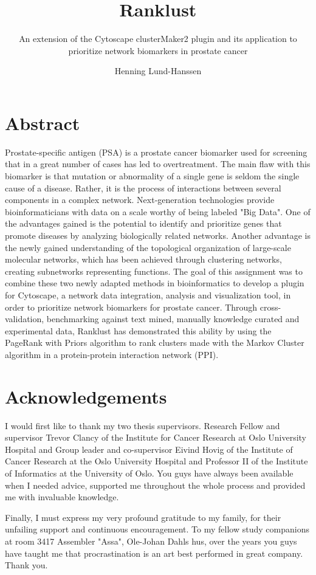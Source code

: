 \documentclass[a4paper,UKenglish]{ifimaster}
\title{Ranklust}
\subtitle{An extension of the Cytoscape clusterMaker2 plugin and its application
to prioritize network biomarkers in prostate cancer}
\author{Henning Lund-Hanssen}
\begin{document}
\duoforside[program={Programming and Networks},
    dept={Department of Informatics},long]

\frontmatter{}

\setlength{\parskip}{12pt}
\setlength{\parindent}{12pt}

\chapter*{Abstract}
Prostate-specific antigen (PSA) is a prostate cancer biomarker used for
screening that in a great number of cases has led to overtreatment. The main
flaw with this biomarker is that mutation or abnormality of a single gene is
seldom the single cause of a disease. Rather, it is the process of interactions
between several components in a complex network. Next-generation technologies
provide bioinformaticians with data on a scale worthy of being labeled "Big
Data". One of the advantages gained is the potential to identify and prioritize
genes that promote diseases by analyzing biologically related networks. Another
advantage is the newly gained understanding of the topological organization of
large-scale molecular networks, which has been achieved through clustering
networks, creating subnetworks representing functions. The goal of this
assignment was to combine these two newly adapted methods in bioinformatics to
develop a plugin for Cytoscape, a network data integration, analysis and
visualization tool, in order to prioritize network biomarkers for prostate
cancer. Through cross-validation, benchmarking against text mined, manually
knowledge curated and experimental data, Ranklust has demonstrated this ability
by using the PageRank with Priors algorithm to rank clusters made with the
Markov Cluster algorithm in a protein-protein interaction network (PPI).

\chapter*{Acknowledgements}
I would first like to thank my two thesis supervisors. Research Fellow and
supervisor Trevor Clancy of the Institute for Cancer Research at Oslo University
Hospital and Group leader and co-supervisor Eivind Hovig of the Institute of
Cancer Research at the Oslo University Hospital and Professor II of the
Institute of Informatics at the University of Oslo. You guys have always been
available when I needed advice, supported me throughout the whole process and
provided me with invaluable knowledge.

Finally, I must express my very profound gratitude to my family, for their
unfailing support and continuous encouragement. To my fellow study companions at
room 3417 Assembler "Assa", Ole-Johan Dahls hus, over the years you guys have
taught me that procrastination is an art best performed in great company. Thank
you.

\tableofcontents{}
\listoffigures{}
\listoftables{}
\lstlistoflistings
\printglossaries

\mainmatter{}





\backmatter{}
\printbibliography
\end{document}
